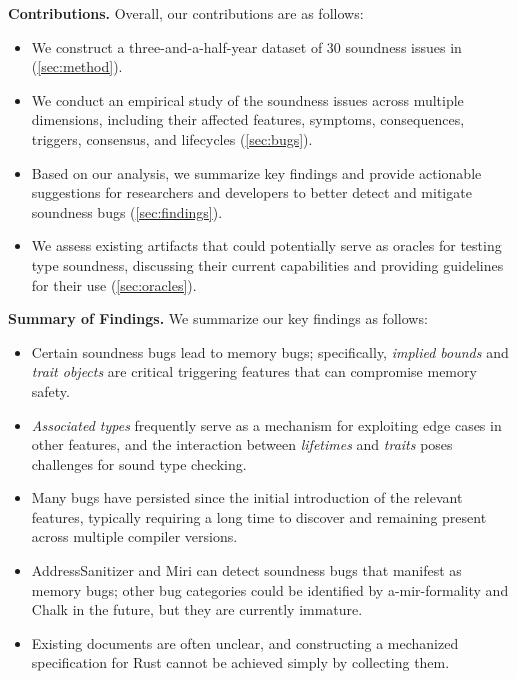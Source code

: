 
\vspace{0.5em} {\bf Contributions.} Overall, our contributions are as follows:
%
\begin{itemize}[leftmargin=*]
  \item We construct a three-and-a-half-year dataset of 30 soundness issues in
    \rustc{} (\cref{sec:method}).
  \item We conduct an empirical study of the soundness issues across multiple
    dimensions, including their affected features, symptoms, consequences,
    triggers, consensus, and lifecycles (\cref{sec:bugs}).
  \item Based on our analysis, we summarize key findings and provide actionable
    suggestions for researchers and \rustc{} developers to better detect and
    mitigate soundness bugs (\cref{sec:findings}).
  \item We assess existing artifacts that could potentially serve as oracles for
    testing type soundness, discussing their current capabilities and providing
    guidelines for their use (\cref{sec:oracles}).
\end{itemize}

{\bf Summary of Findings.} We summarize our key findings as follows:
%
\begin{itemize}[leftmargin=*]
  \item Certain soundness bugs lead to memory bugs; specifically, \emph{implied
    bounds} and \emph{trait objects} are critical triggering features that can
    compromise memory safety.
  \item \emph{Associated types} frequently serve as a mechanism for exploiting
    edge cases in other features, and the interaction between \emph{lifetimes}
    and \emph{traits} poses challenges for sound type checking.
  \item Many bugs have persisted since the initial introduction of the relevant
    features, typically requiring a long time to discover and remaining present
    across multiple compiler versions.
  \item AddressSanitizer and Miri can detect soundness bugs that manifest as
    memory bugs; other bug categories could be identified by a-mir-formality and
    Chalk in the future, but they are currently immature.
  \item Existing documents are often unclear, and constructing a mechanized
    specification for Rust cannot be achieved simply by collecting them.
\end{itemize}
